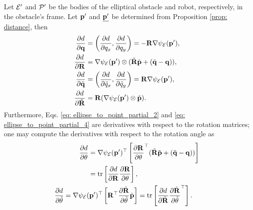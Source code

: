 \begin{proposition}
    Let ${\cal E}'$ and ${\cal P}'$ be the bodies of the elliptical obstacle and robot, respectively, in the obstacle's frame. Let $\mathbf{p}'$ and $\underline{\mathbf{p}'}$ be determined from Proposition \ref{prop: distance}, then 
    \begin{align}
    \frac{\partial d}{\partial \mathbf{q}} 
    &= \left( \frac{\partial d}{\partial q_x},\frac{\partial d}{\partial q_y} \right)
    = -\mathbf{R} \nabla \psi_{\cal E}(\mathbf{p}') \label{eq: ellipse_to_point_partial_1}, \\
    \frac{\partial d}{\partial \mathbf{R}} 
    &= \nabla \psi_{\cal E}(\mathbf{p}')\otimes (\tilde{\mathbf{R}} \tilde{\mathbf{p}} + (\tilde{\mathbf{q}} - \mathbf{q}))\label{eq: ellipse_to_point_partial_2}, \\
    \frac{\partial d}{\partial \tilde{\mathbf{q}}} 
    &= \left( \frac{\partial d}{\partial \tilde{q}_x},\frac{\partial d}{\partial \tilde{q}_y} \right)
    = \mathbf{R} \nabla \psi_{\cal E}(\mathbf{p}') \label{eq: ellipse_to_point_partial_3}, \\
    \frac{\partial d}{\partial \tilde{\mathbf{R}}} 
    &= \mathbf{R} (\nabla \psi_{\cal E}(\mathbf{p}') \otimes \tilde{\mathbf{p}}) \label{eq: ellipse_to_point_partial_4}.
\end{align}
Furthermore, Eqs. \eqref{eq: ellipse_to_point_partial_2} and \eqref{eq: ellipse_to_point_partial_4} are derivatives with respect to the rotation matrices; one may compute the derivatives with respect to the rotation angle as
\begin{align}
    \begin{split}
    \frac{\partial d}{\partial \theta} 
        &= \nabla \psi_{\cal E}(\mathbf{p}')^\top \left[\frac{\partial \mathbf{R}}{\partial \theta}^\top (\tilde{\mathbf{R}} \tilde{\mathbf{p}} + (\tilde{\mathbf{q}} - \mathbf{q})) \right] \\
        &= \text{tr}\left[ \frac{\partial d}{\partial \mathbf{R}} \frac{\partial \mathbf{R}}{\partial \theta} \right],
    \end{split} \label{eq: ellipse_to_point_partial_2_v2} \\
    \begin{split}
    \frac{\partial d}{\partial \tilde{\theta}}  
        &= \nabla \psi_{\cal E}(\mathbf{p}')^\top \left[ \mathbf{R}^\top \frac{\partial \tilde{\mathbf{R}}}{\partial \tilde{\theta}} \tilde{\mathbf{p}} \right] 
        = \text{tr}\left[ \frac{\partial d}{\partial \tilde{\mathbf{R}}} \frac{\partial \tilde{\mathbf{R}}}{\partial \tilde{\theta}}^\top \right].
    \end{split}
\end{align}
\end{proposition}

